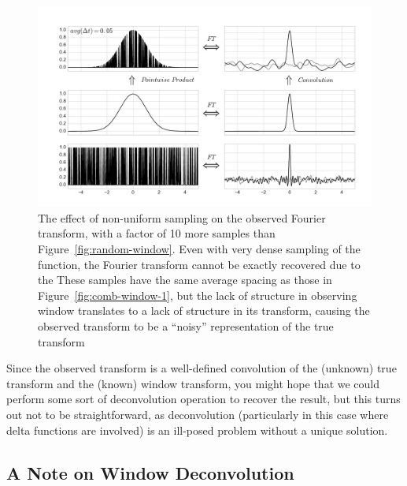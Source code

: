 \documentclass[preprint]{aastex}
\newcommand{\fig}[1]{Figure~\ref{fig:#1}}
\newcommand{\figlabel}[1]{\label{fig:#1}}
\begin{document}
\begin{figure}[ht]
  \centering
  \includegraphics[width=\textwidth]{fig11_random_window_2}
  \caption{The effect of non-uniform sampling on the observed Fourier transform,
    with a factor of 10 more samples than \fig{random-window}.
    Even with very dense sampling of the function, the Fourier transform
    cannot be exactly recovered due to the 
    These samples have the same average spacing as those in \fig{comb-window-1},
    but the lack of structure in observing window translates to a lack of
    structure in its transform, causing the observed transform to be a
    ``noisy'' representation of the true transform
    \figlabel{random-window-2}}
\end{figure}

Since the observed transform is a well-defined convolution of the (unknown) true
transform and the (known) window transform, you might hope that we could
perform some sort of deconvolution operation to recover the result, but this
turns out not to be straightforward, as deconvolution (particularly in this
case where delta functions are involved) is an ill-posed problem without a
unique solution.

\subsection{A Note on Window Deconvolution}
\end{document}
